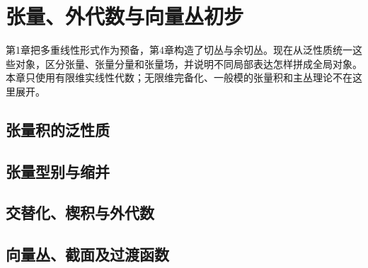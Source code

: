 \chapter{张量、外代数与向量丛初步}
\label{ch:06-tensors}

第1章把多重线性形式作为预备，第4章构造了切丛与余切丛。现在从泛性质统一这些对象，区分张量、张量分量和张量场，并说明不同局部表达怎样拼成全局对象。本章只使用有限维实线性代数；无限维完备化、一般模的张量积和主丛理论不在这里展开。

\section{张量积的泛性质}


\section{张量型别与缩并}


\section{交替化、楔积与外代数}


\section{向量丛、截面及过渡函数}



